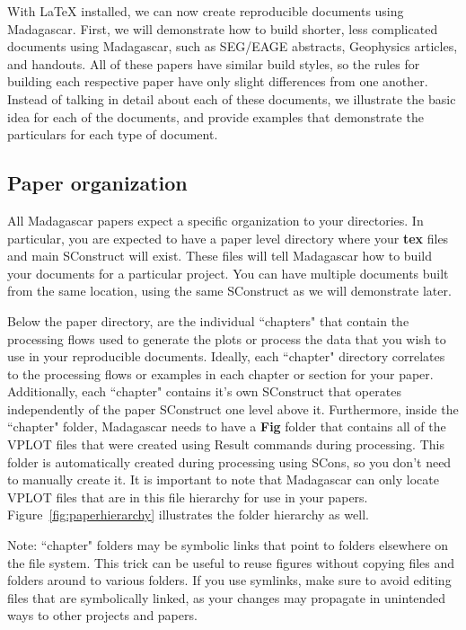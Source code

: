 With LaTeX installed, we can now create reproducible documents using Madagascar.  First, we will demonstrate how to build shorter, less complicated documents using Madagascar, such as SEG/EAGE abstracts, Geophysics articles, and handouts.  All of these papers have similar build styles, so the rules for building each respective paper have only slight differences from one another.  Instead of talking in detail about each of these documents, we illustrate the basic idea for each of the documents, and provide examples that demonstrate the particulars for each type of document.  

\subsection{Paper organization}

All Madagascar papers expect a specific organization to your directories.  In particular, you are expected to have a paper level directory where your \textbf{tex} files and main SConstruct will exist.  These files will tell Madagascar how to build your documents for a particular project.  You can have multiple documents built from the same location, using the same SConstruct as we will demonstrate later.  

Below the paper directory, are the individual ``chapters" that contain the processing flows used to generate the plots or process the data that you wish to use in your reproducible documents.  Ideally, each ``chapter" directory correlates to the processing flows or examples in each chapter or section for your paper.  Additionally, each ``chapter" contains it's own SConstruct that operates independently of the paper SConstruct one level above it.  Furthermore, inside the ``chapter" folder, Madagascar needs to have a \textbf{Fig} folder that contains all of the VPLOT files that were created using Result commands during processing.    This folder is automatically created during processing using SCons, so you don't need to manually create it.  It is important to note that Madagascar can only locate VPLOT files that are in this file hierarchy for use in your papers.  Figure~\ref{fig:paperhierarchy} illustrates the folder hierarchy as well.

Note: ``chapter" folders may be symbolic links that point to folders elsewhere on the file system.  This trick can be useful to reuse figures without copying files and folders around to various folders.  If you use symlinks, make sure to avoid editing files that are symbolically linked, as your changes may propagate in unintended ways to other projects and papers.

